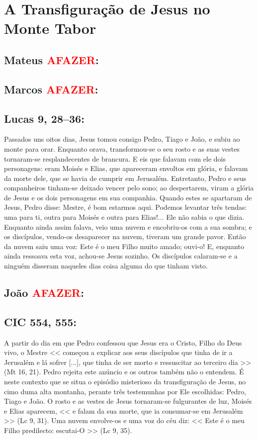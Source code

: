 \documentclass[10pt,a5paper]{book}
\newcommand{\from}[1]{\subsection*{#1}}
\newcommand{\TODO}{\textcolor{red}{\ttfamily AFAZER}}
\begin{document}

\section{A Transfiguração de Jesus no Monte Tabor}

\from{Mateus \TODO:}

\from{Marcos \TODO:}

\from{Lucas 9, 28--36:}

Passados uns oitos dias, Jesus tomou consigo Pedro, Tiago e João, e subiu ao monte para orar.
Enquanto orava, transformou-se o seu rosto e as suas vestes tornaram-se resplandecentes de brancura.
E eis que falavam com ele dois personagens: eram Moisés e Elias,
que apareceram envoltos em glória, e falavam da morte dele, que se havia de cumprir em Jerusalém.
Entretanto, Pedro e seus companheiros tinham-se deixado vencer pelo sono; ao despertarem, viram a glória de Jesus e os dois personagens em sua companhia.
Quando estes se apartaram de Jesus, Pedro disse: Mestre, é bom estarmos aqui. Podemos levantar três tendas: uma para ti, outra para Moisés e outra para Elias!... Ele não sabia o que dizia.
Enquanto ainda assim falava, veio uma nuvem e encobriu-os com a sua sombra; e os discípulos, vendo-os desaparecer na nuvem, tiveram um grande pavor.
Então da nuvem saiu uma voz: Este é o meu Filho muito amado; ouvi-o!
E, enquanto ainda ressoava esta voz, achou-se Jesus sozinho. Os discípulos calaram-se e a ninguém disseram naqueles dias coisa alguma do que tinham visto.

\from{João \TODO:}

\from{CIC 554, 555:}

A partir do dia em que Pedro confessou que Jesus era o Cristo, Filho do Deus vivo, o Mestre << começou a explicar aos seus discípulos que tinha de ir a Jerusalém e lá sofrer [...], que tinha de ser morto e ressuscitar ao terceiro dia >> (Mt 16, 21). Pedro rejeita este anúncio e os outros também não o entendem. É neste contexto que se situa o episódio misterioso da transfiguração de Jesus, no cimo duma alta montanha, perante três testemunhas por Ele escolhidas: Pedro, Tiago e João. O rosto e as vestes de Jesus tornaram-se fulgurantes de luz, Moisés e Elias aparecem, << e falam da sua morte, que ia consumar-se em Jerusalém >> (Lc 9, 31). Uma nuvem envolve-os e uma voz do céu diz: << Este é o meu Filho predilecto: escutai-O >> (Lc 9, 35).
\end{document}
